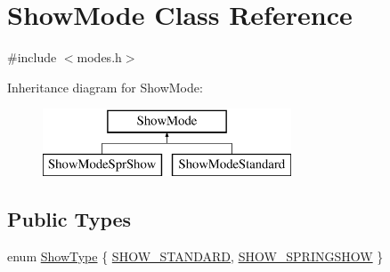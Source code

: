\hypertarget{a00140}{\section{Show\-Mode Class Reference}
\label{a00140}
}


{\ttfamily \#include $<$modes.\-h$>$}

Inheritance diagram for Show\-Mode\-:\begin{figure}[H]
\begin{center}
\leavevmode
\includegraphics[height=2.000000cm]{a00140}
\end{center}
\end{figure}
\subsection*{Public Types}
\begin{DoxyCompactItemize}
\item 
enum \hyperlink{a00140_a03678eaf2ac733b19b863d9fef35077c}{Show\-Type} \{ \hyperlink{a00140_a03678eaf2ac733b19b863d9fef35077ca1f80ba765c4ff74fb7e8c3c6e26641e2}{S\-H\-O\-W\-\_\-\-S\-T\-A\-N\-D\-A\-R\-D}, 
\hyperlink{a00140_a03678eaf2ac733b19b863d9fef35077ca57de5e77c3b042b311457d1c3ca61c24}{S\-H\-O\-W\-\_\-\-S\-P\-R\-I\-N\-G\-S\-H\-O\-W}
 \}
\end{DoxyCompactItemize}

